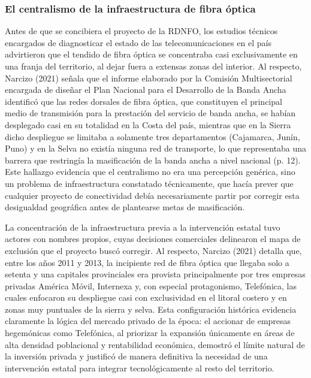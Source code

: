 \subsubsection{El centralismo de la infraestructura de fibra óptica}
Antes de que se concibiera el proyecto de la RDNFO, los estudios técnicos encargados de diagnosticar el estado de las telecomunicaciones en el país advirtieron que el tendido de fibra óptica se concentraba casi exclusivamente en una franja del territorio, al dejar fuera a extensas zonas del interior. Al respecto, Narcizo (2021) señala que el informe elaborado por la Comisión Multisectorial encargada de diseñar el Plan Nacional para el Desarrollo de la Banda Ancha identificó que las redes dorsales de fibra óptica, que constituyen el principal medio de transmisión para la prestación del servicio de banda ancha, se habían desplegado casi en su totalidad en la Costa del país, mientras que en la Sierra dicho despliegue se limitaba a solamente tres departamentos (Cajamarca, Junín, Puno) y en la Selva no existía ninguna red de transporte, lo que representaba una barrera que restringía la masificación de la banda ancha a nivel nacional (p. 12). Este hallazgo evidencia que el centralismo no era una percepción genérica, sino un problema de infraestructura constatado técnicamente, que hacía prever que cualquier proyecto de conectividad debía necesariamente partir por corregir esta desigualdad geográfica antes de plantearse metas de masificación.

La concentración de la infraestructura previa a la intervención estatal tuvo actores con nombres propios, cuyas decisiones comerciales delinearon el mapa de exclusión que el proyecto buscó corregir. Al respecto, Narcizo (2021) detalla que, entre los años 2011 y 2013, la incipiente red de fibra óptica que llegaba solo a setenta y una capitales provinciales era provista principalmente por tres empresas privadas América Móvil, Internexa y, con especial protagonismo, Telefónica, las cuales enfocaron su despliegue casi con exclusividad en el litoral costero y en zonas muy puntuales de la sierra y selva. Esta configuración histórica evidencia claramente la lógica del mercado privado de la época: el accionar de empresas hegemónicas como Telefónica, al priorizar la expansión únicamente en áreas de alta densidad poblacional y rentabilidad económica, demostró el límite natural de la inversión privada y justificó de manera definitiva la necesidad de una intervención estatal para integrar tecnológicamente al resto del territorio.
